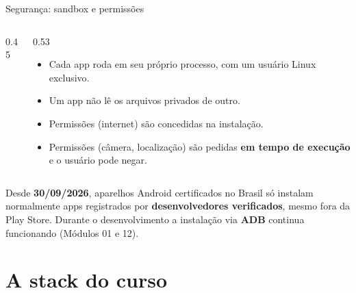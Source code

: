 \documentclass[aspectratio=169,10pt]{beamer}
\begin{document}
\begin{frame}{Segurança: sandbox e permissões}
  \begin{columns}[c]
    \begin{column}{0.45\textwidth}
      \centering
    \end{column}
    \begin{column}{0.53\textwidth}
      \small
      \begin{itemize}
        \item Cada app roda em seu próprio processo, com um usuário Linux exclusivo.
        \item Um app não lê os arquivos privados de outro.
        \item Permissões  (internet) são concedidas na instalação.
        \item Permissões  (câmera, localização) são pedidas \textbf{em tempo de execução} e o usuário pode negar.
      \end{itemize}
    \end{column}
  \end{columns}
  \begin{atencao}
    Desde \textbf{30/09/2026}, aparelhos Android certificados no Brasil só instalam normalmente apps registrados por \textbf{desenvolvedores verificados}, mesmo fora da Play Store. Durante o desenvolvimento a instalação via \textbf{ADB} continua funcionando (Módulos 01 e 12).
  \end{atencao}
\end{frame}

\section{A stack do curso}
\end{document}
